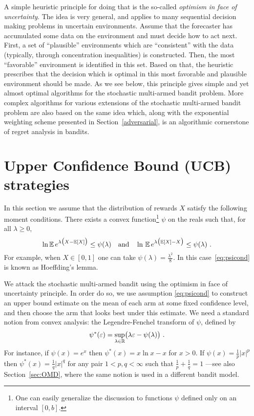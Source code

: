 A simple heuristic principle for doing that is the so-called {\em optimism in face of uncertainty}. The idea is very general, and applies to many sequential decision making problems in uncertain environments. Assume that the forecaster has accumulated some data on the environment and must decide how to act next. First, a set of ``plausible'' environments which are ``consistent'' with the data (typically, through concentration inequalities) is constructed. Then, the most ``favorable'' environment is identified in this set. Based on that, the heuristic prescribes that the decision which is optimal in this most favorable and plausible environment should be made. As we see below, this principle gives simple and yet almost optimal algorithms for the stochastic multi-armed bandit problem. More complex algorithms for various extensions of the stochastic multi-armed bandit problem are also based on the same idea which, along with the exponential weighting scheme presented in Section~\ref{adversarial}, is an algorithmic cornerstone of regret analysis in bandits. 

\section{Upper Confidence Bound (UCB) strategies} \label{sec:UCB}
In this section we assume that the distribution of rewards $X$ satisfy the following moment conditions. There exists a convex function\footnote{
One can easily generalize the discussion to functions $\psi$ defined only on an interval $[0,b]$.
}
$\psi$ on the reals such that, for all $\lambda \geq 0$,
\begin{equation} \label{eq:psicond}
\ln \mathbb{E}\,e^{\lambda \bigl(X-\mathbb{E}[X]\bigr)} \leq \psi(\lambda) \quad\text{and}\quad  \ln\,\mathbb{E}\,e^{\lambda \bigl(\mathbb{E}[X] - X\bigr)} \leq \psi(\lambda)~.
\end{equation}
For example, when $X \in [0,1]$ one can take $\psi(\lambda) = \tfrac{\lambda^2}{8}$. In this case~\eqref{eq:psicond} is known as Hoeffding's lemma.

We attack the stochastic multi-armed bandit using the optimism in face of uncertainty principle. In order do so, we use assumption \eqref{eq:psicond} to construct an upper bound estimate on the mean of each arm at some fixed confidence level, and then choose the arm that looks best under this estimate. We need a standard notion from convex analysis: the Legendre-Fenchel transform of $\psi$, defined by
\[
    \psi^*(\varepsilon) = \sup_{\lambda \in \mathbb{R}} \bigl(\lambda \varepsilon - \psi(\lambda)\bigr)~.
\]
For instance, if $\psi(x) = e^x$ then $\psi^*(x) = x\ln x - x$ for $x > 0$. If $\psi(x) = \frac{1}{p}|x|^p$ then $\psi^*(x) = \frac{1}{q}|x|^q$ for any pair $1 < p,q < \infty$ such that $\frac{1}{p} + \frac{1}{q} = 1$ ---see also Section~\ref{sec:OMD}, where the same notion is used in a different bandit model. 

